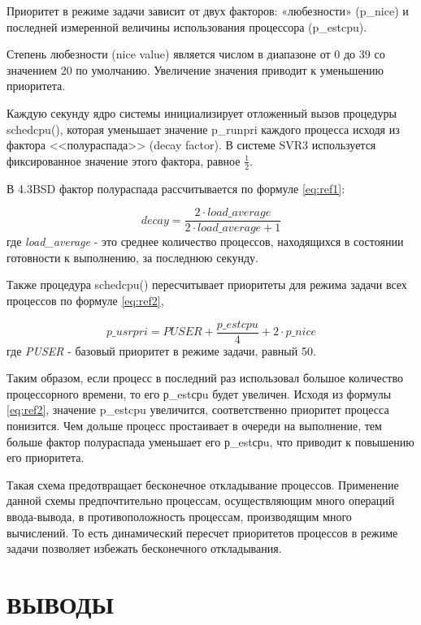 Приоритет в режиме задачи зависит от двух факторов: «любезности» (p\_nice) и последней измеренной величины использования процессора \newline(p\_estcpu). 

Степень любезности (nice value) является числом в диапазоне от 0 до 39 со значением 20 по умолчанию. Увеличение значения приводит к уменьшению приоритета.

Каждую секунду ядро системы инициализирует отложенный вызов процедуры schedcpu(), которая уменьшает значение p\_runpri каждого процесса исходя из фактора <<полураспада>> (decay factor). В системе SVR3 используется фиксированное значение этого фактора, равное $\frac{1}{2}$.

В 4.3BSD фактор полураспада рассчитывается по формуле \ref{eq:ref1}:

\begin{equation}
	\label{eq:ref1}
	decay = \frac{2 \cdot load\_average}{2 \cdot load\_average + 1}
\end{equation} где
\textit{load\_average} - это среднее количество процессов, находящихся в состоянии готовности к выполнению, за последнюю секунду.

Также процедура schedcpu() пересчитывает приоритеты для режима задачи
всех процессов по формуле \ref{eq:ref2},

\begin{equation}
	\label{eq:ref2}
	p\_usrpri = PUSER + \frac{p\_estcpu}{4} + 2 \cdot p\_nice
\end{equation}где \textit{PUSER} - базовый приоритет в режиме задачи, равный 50.

Таким образом, если процесс в последний раз использовал большое количество процессорного времени, то его р\_estсрu будет увеличен. Исходя из формулы \ref{eq:ref2}, значение p\_estcpu увеличится, соответственно приоритет процесса понизится.  
Чем дольше процесс простаивает в очереди на выполнение, тем больше фактор полураспада уменьшает его р\_estсрu, что приводит к повышению его приоритета. 

Такая схема предотвращает бесконечное откладывание процессов. Применение данной схемы предпочтительно процессам, осуществляющим много операций ввода-вывода, в противоположность процессам, производящим много вычислений. То есть динамический пересчет приоритетов процессов в режиме задачи позволяет избежать бесконечного откладывания.


\chapter*{ВЫВОДЫ}

